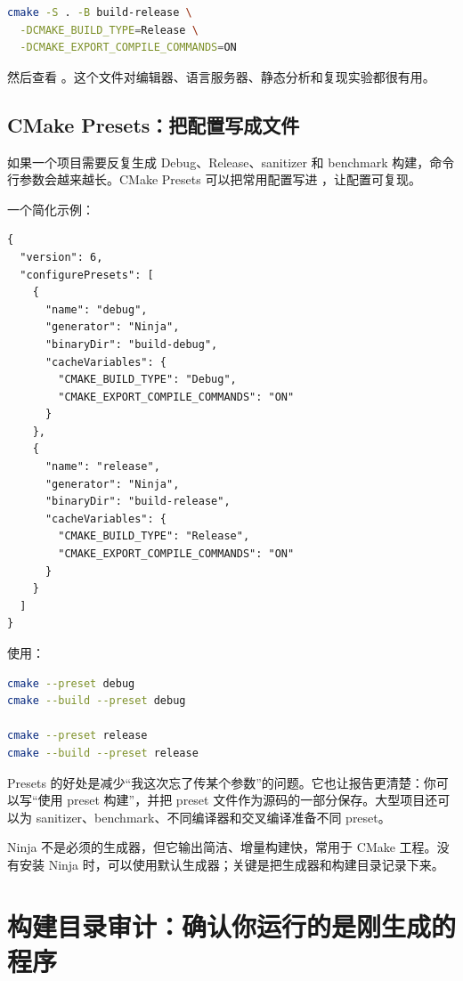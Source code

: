 \begin{lstlisting}[language=bash]
cmake -S . -B build-release \
  -DCMAKE_BUILD_TYPE=Release \
  -DCMAKE_EXPORT_COMPILE_COMMANDS=ON
\end{lstlisting}

然后查看 。这个文件对编辑器、语言服务器、静态分析和复现实验都很有用。

\subsection{CMake Presets：把配置写成文件}

如果一个项目需要反复生成 Debug、Release、sanitizer 和 benchmark 构建，命令行参数会越来越长。CMake Presets 可以把常用配置写进 ，让配置可复现。

一个简化示例：

\begin{lstlisting}
{
  "version": 6,
  "configurePresets": [
    {
      "name": "debug",
      "generator": "Ninja",
      "binaryDir": "build-debug",
      "cacheVariables": {
        "CMAKE_BUILD_TYPE": "Debug",
        "CMAKE_EXPORT_COMPILE_COMMANDS": "ON"
      }
    },
    {
      "name": "release",
      "generator": "Ninja",
      "binaryDir": "build-release",
      "cacheVariables": {
        "CMAKE_BUILD_TYPE": "Release",
        "CMAKE_EXPORT_COMPILE_COMMANDS": "ON"
      }
    }
  ]
}
\end{lstlisting}

使用：

\begin{lstlisting}[language=bash]
cmake --preset debug
cmake --build --preset debug

cmake --preset release
cmake --build --preset release
\end{lstlisting}

Presets 的好处是减少“我这次忘了传某个参数”的问题。它也让报告更清楚：你可以写“使用  preset 构建”，并把 preset 文件作为源码的一部分保存。大型项目还可以为 sanitizer、benchmark、不同编译器和交叉编译准备不同 preset。

\begin{deepdive}
Ninja 不是必须的生成器，但它输出简洁、增量构建快，常用于 CMake 工程。没有安装 Ninja 时，可以使用默认生成器；关键是把生成器和构建目录记录下来。
\end{deepdive}

\section{构建目录审计：确认你运行的是刚生成的程序}

